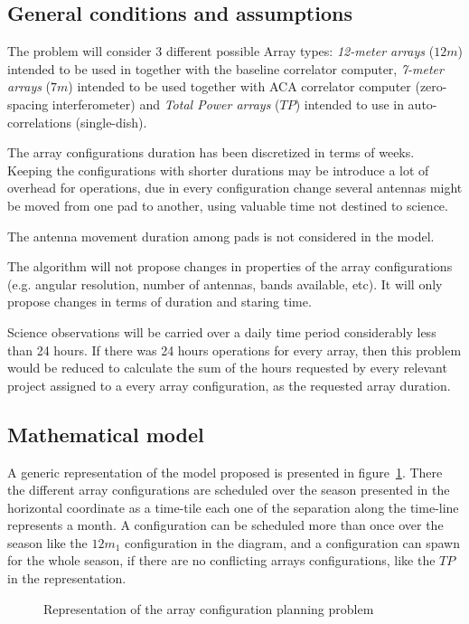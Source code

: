 \subsection{General conditions and assumptions}
\label{sec:array-problem-general-condition}
The problem will consider 3 different possible Array types: \textit{12-meter arrays} ($12m$) intended to be used in together with the baseline correlator computer, \textit{7-meter arrays} ($7m$) intended to be used together with ACA correlator computer (zero-spacing interferometer) and \textit{Total Power arrays} ($TP$) intended to use in auto-correlations (single-dish). 

The array configurations duration has been discretized in terms of weeks. Keeping the configurations with shorter durations may be introduce a lot of overhead for operations, due in every configuration change several antennas might be moved from one pad to another, using valuable time not destined to science.

The antenna movement duration among pads is not considered in the model.

The algorithm will not propose changes in properties of the array configurations (e.g. angular resolution, number of antennas, bands available, etc). It will only propose changes in terms of duration and staring time.

Science observations will be carried over a daily time period considerably less than 24 hours. If there was 24 hours operations for every array, then this problem would be reduced to calculate the sum of the hours requested by every relevant project assigned to a every array configuration, as the requested array duration.

\subsection{Mathematical model}

A generic representation of the model proposed is presented in figure~\ref{fig:array-planning-representation}. There the different array configurations are scheduled over the season presented in the horizontal coordinate as a time-tile each one of the separation along the time-line represents a month. A configuration can be scheduled more than once over the season like the $12m_1$ configuration in the diagram, and a configuration can spawn for the whole season, if there are no conflicting arrays configurations, like the $TP$ in the representation.

\begin{figure}
\def\svgwidth{\textwidth}

\caption{Representation of the array configuration planning problem}
\label{fig:array-planning-representation}
\end{figure}

